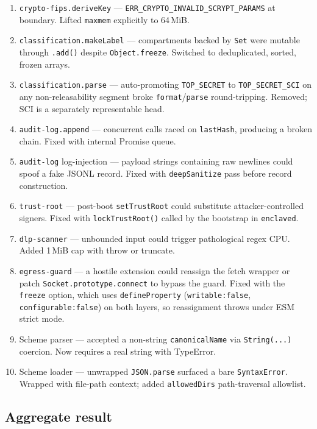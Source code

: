 \documentclass[11pt]{article}
\begin{document}
\begin{enumerate}
  \item \texttt{crypto-fips.deriveKey} ---
    \texttt{ERR\_CRYPTO\_INVALID\_SCRYPT\_PARAMS} at boundary. Lifted
    \texttt{maxmem} explicitly to 64\,MiB.
  \item \texttt{classification.makeLabel} --- compartments backed by
    \texttt{Set} were mutable through \texttt{.add()} despite
    \texttt{Object.freeze}. Switched to deduplicated, sorted, frozen
    arrays.
  \item \texttt{classification.parse} --- auto-promoting
    \texttt{TOP\_SECRET} to \texttt{TOP\_SECRET\_SCI} on any
    non-releasability segment broke \texttt{format}/\texttt{parse}
    round-tripping. Removed; SCI is a separately representable head.
  \item \texttt{audit-log.append} --- concurrent calls raced on
    \texttt{lastHash}, producing a broken chain. Fixed with internal
    Promise queue.
  \item \texttt{audit-log} log-injection --- payload strings containing
    raw newlines could spoof a fake JSONL record. Fixed with
    \texttt{deepSanitize} pass before record construction.
  \item \texttt{trust-root} --- post-boot \texttt{setTrustRoot} could
    substitute attacker-controlled signers. Fixed with
    \texttt{lockTrustRoot()} called by the bootstrap in
    \texttt{enclaved}.
  \item \texttt{dlp-scanner} --- unbounded input could trigger
    pathological regex CPU. Added 1\,MiB cap with throw or truncate.
  \item \texttt{egress-guard} --- a hostile extension could reassign
    the fetch wrapper or patch \texttt{Socket.prototype.connect} to
    bypass the guard. Fixed with the \texttt{freeze} option, which uses
    \texttt{defineProperty} (\texttt{writable:false},
    \texttt{configurable:false}) on both layers, so reassignment throws
    under ESM strict mode.
  \item Scheme parser --- accepted a non-string \texttt{canonicalName}
    via \texttt{String(...)} coercion. Now requires a real string with
    TypeError.
  \item Scheme loader --- unwrapped \texttt{JSON.parse} surfaced a
    bare \texttt{SyntaxError}. Wrapped with file-path context; added
    \texttt{allowedDirs} path-traversal allowlist.
\end{enumerate}

\subsection{Aggregate result}
\end{document}
